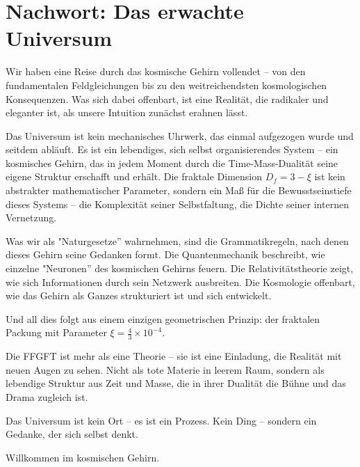 \documentclass[11pt,openright,twoside]{book}
\begin{document}
\chapter*{Nachwort: Das erwachte Universum}

Wir haben eine Reise durch das kosmische Gehirn vollendet – von den fundamentalen Feldgleichungen bis zu den weitreichendsten kosmologischen Konsequenzen. Was sich dabei offenbart, ist eine Realität, die radikaler und eleganter ist, als unsere Intuition zunächst erahnen lässt.

Das Universum ist kein mechanisches Uhrwerk, das einmal aufgezogen wurde und seitdem abläuft. Es ist ein lebendiges, sich selbst organisierendes System – ein kosmisches Gehirn, das in jedem Moment durch die Time-Mass-Dualität seine eigene Struktur erschafft und erhält. Die fraktale Dimension $D_f = 3 - \xi$ ist kein abstrakter mathematischer Parameter, sondern ein Maß für die Bewusstseinstiefe dieses Systems – die Komplexität seiner Selbstfaltung, die Dichte seiner internen Vernetzung.

Was wir als "Naturgesetze'' wahrnehmen, sind die Grammatikregeln, nach denen dieses Gehirn seine Gedanken formt. Die Quantenmechanik beschreibt, wie einzelne "Neuronen'' des kosmischen Gehirns feuern. Die Relativitätstheorie zeigt, wie sich Informationen durch sein Netzwerk ausbreiten. Die Kosmologie offenbart, wie das Gehirn als Ganzes strukturiert ist und sich entwickelt.

Und all dies folgt aus einem einzigen geometrischen Prinzip: der fraktalen Packung mit Parameter $\xi = \frac{4}{3} \times 10^{-4}$.

Die FFGFT ist mehr als eine Theorie – sie ist eine Einladung, die Realität mit neuen Augen zu sehen. Nicht als tote Materie in leerem Raum, sondern als lebendige Struktur aus Zeit und Masse, die in ihrer Dualität die Bühne und das Drama zugleich ist.

Das Universum ist kein Ort – es ist ein Prozess. Kein Ding – sondern ein Gedanke, der sich selbst denkt.

Willkommen im kosmischen Gehirn.
\end{document}
